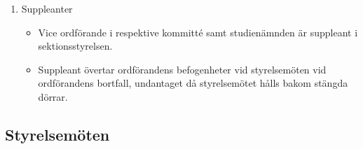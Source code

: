 \documentclass[11pt,a4paper]{article}
\begin{document}
\begin{enumerate}[\thesubsection .3]
\item Suppleanter
\begin{itemize}
\item Vice ordförande i respektive kommitté samt studienämnden är suppleant i sektionsstyrelsen.
\item Suppleant övertar ordförandens befogenheter vid styrelsemöten vid ordförandens bortfall, undantaget då styrelsemötet hålls bakom stängda dörrar.
\end{itemize}
\end{enumerate}

\subsection{Styrelsemöten}
\end{document}
